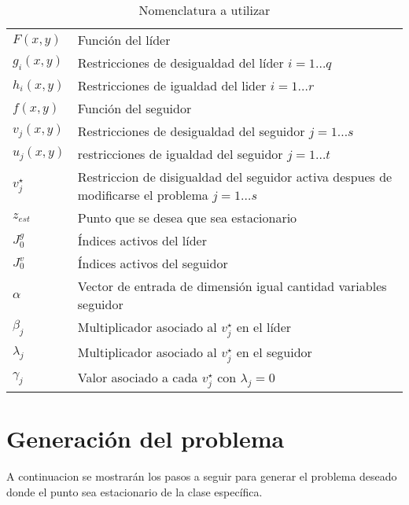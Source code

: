 \begin{table}[H]
    \centering
    \caption{Nomenclatura a utilizar}
    \begin{tabular}{l m{360pt}}
        $ F(x,y) $              & Función del líder                                                                                                          \\
        $ g_i(x,y) $              & Restricciones de desigualdad del líder   $ i=1\ldots q$                                                                                                         \\
        $ h_i(x,y) $                 & Restricciones de igualdad del lider   $ i=1\ldots r$                    \\
        $ f(x,y) $           & Función del seguidor                                                               \\
        $ v_j(x,y) $              &  Restricciones de desigualdad del seguidor $j=1\ldots s$   \\
        $ u_j(x,y) $     & restricciones de igualdad del seguidor $j=1\ldots t$ \\
        $ v_{j}^{\star} $    & Restriccion de disigualdad del seguidor activa despues de modificarse el problema   $j=1\ldots s$          \\
        $z_{est}$         & Punto que se desea que sea estacionario\\
        $J_0^g$             & Índices activos del líder \\
        $J_0^v$                & Índices activos del seguidor \\
        $ \alpha  $             & Vector de entrada de dimensión igual cantidad variables seguidor                                                                                                      \\
        $ \beta_j $               & Multiplicador asociado al $v_{j}^{\star}$ en el líder          \\
        $ \lambda_j $              & Multiplicador asociado al $v_{j}^{\star}$ en el seguidor\\
        $\gamma_j$                & Valor asociado a cada $v_{j}^{\star}$ con $\lambda_j=0$\\
    \end{tabular}

    \end{table}


\section{Generación del problema}
A continuacion se mostrarán los pasos a seguir para generar el problema deseado donde el punto sea estacionario de la clase específica.
